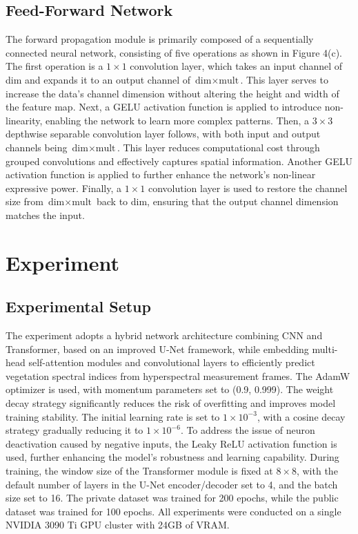 \documentclass[preprint,review,12pt]{elsarticle}
\begin{document}
\subsection{Feed-Forward Network}

The forward propagation module is primarily composed of a sequentially connected neural network, consisting of five operations as shown in Figure 4(c). The first operation is a $1 \times 1$ convolution layer, which takes an input channel of dim and expands it to an output channel of $\text{dim} \times \text{mult}$. This layer serves to increase the data's channel dimension without altering the height and width of the feature map. Next, a GELU activation function is applied to introduce non-linearity, enabling the network to learn more complex patterns. Then, a $3 \times 3$ depthwise separable convolution layer follows, with both input and output channels being $\text{dim} \times \text{mult}$. This layer reduces computational cost through grouped convolutions and effectively captures spatial information. Another GELU activation function is applied to further enhance the network's non-linear expressive power. Finally, a $1 \times 1$ convolution layer is used to restore the channel size from $\text{dim} \times \text{mult}$ back to dim, ensuring that the output channel dimension matches the input.

\section{Experiment}
\label{sec:experiment}

\subsection{Experimental Setup}

The experiment adopts a hybrid network architecture combining CNN and Transformer, based on an improved U-Net framework, while embedding multi-head self-attention modules and convolutional layers to efficiently predict vegetation spectral indices from hyperspectral measurement frames. The AdamW optimizer \cite{loshchilov2019} is used, with momentum parameters set to (0.9, 0.999). The weight decay strategy significantly reduces the risk of overfitting and improves model training stability. The initial learning rate is set to $1 \times 10^{-3}$, with a cosine decay strategy gradually reducing it to $1 \times 10^{-6}$. To address the issue of neuron deactivation caused by negative inputs, the Leaky ReLU activation function \cite{xu2020} is used, further enhancing the model's robustness and learning capability. During training, the window size of the Transformer module is fixed at $8 \times 8$, with the default number of layers in the U-Net encoder/decoder set to 4, and the batch size set to 16. The private dataset was trained for 200 epochs, while the public dataset was trained for 100 epochs. All experiments were conducted on a single NVIDIA 3090 Ti GPU cluster with 24GB of VRAM.
\end{document}
